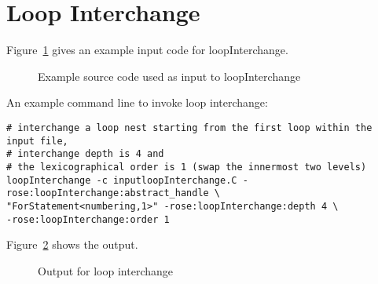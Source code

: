 \clearpage %
\section{Loop Interchange}

Figure~\ref{Tutorial:exampleInputCode_LoopInterchangep} gives an example
input code for loopInterchange.

\begin{figure}[!h]
{\indent
  {\mySmallFontSize
      \begin{latexonly}
    
    \end{latexonly}
      \begin{htmlonly}
    
    \end{htmlonly}
  }
}
\caption{Example source code used as input to loopInterchange}
    \label{Tutorial:exampleInputCode_LoopInterchangep}
\end{figure}


An example command line to invoke loop interchange:
\begin{verbatim}
# interchange a loop nest starting from the first loop within the input file, 
# interchange depth is 4 and 
# the lexicographical order is 1 (swap the innermost two levels)
loopInterchange -c inputloopInterchange.C -rose:loopInterchange:abstract_handle \
"ForStatement<numbering,1>" -rose:loopInterchange:depth 4 \
-rose:loopInterchange:order 1
\end{verbatim}

Figure~\ref{Tutorial:exampleOutput_LoopInterchangep} shows the output.
\begin{figure}[!h]
{\indent
  {\mySmallFontSize
      \begin{latexonly}
    
    \end{latexonly}
      \begin{htmlonly}
    
    \end{htmlonly}
  }
}
\caption{Output for loop interchange}
    \label{Tutorial:exampleOutput_LoopInterchangep}
\end{figure}

\clearpage
